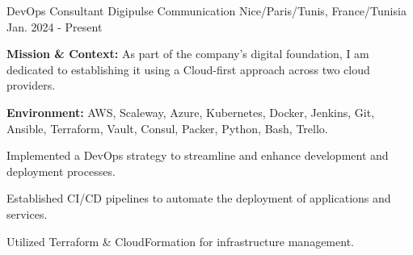 
\begin{cventries}

\cventry
{DevOps Consultant} %
{Digipulse Communication} %
{Nice/Paris/Tunis, France/Tunisia} %
{Jan. 2024 - Present} %
{
  \begin{cvitems} %
    \item {\textbf{Mission \& Context:} As part of the company's digital foundation, I am dedicated to establishing it using a Cloud-first approach across two cloud providers.}
    \item {\textbf{Environment:} AWS, Scaleway, Azure, Kubernetes, Docker, Jenkins, Git, Ansible, Terraform, Vault, Consul, Packer, Python, Bash, Trello.}
    \item {Implemented a DevOps strategy to streamline and enhance development and deployment processes.}
    \item {Established CI/CD pipelines to automate the deployment of applications and services.}
    \item {Utilized Terraform \& CloudFormation for infrastructure management.}
  \end{cvitems}
}


\end{cventries}
